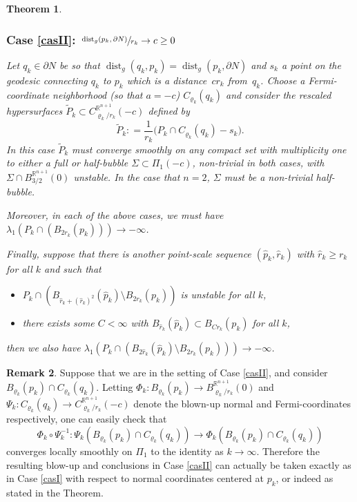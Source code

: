 \documentclass[JEP,XML,SOM,Unicode]{cedram}
\newcounter{cas}
\DeclareMathOperator{\dist}{dist}
\newtheorem{thm}{Theorem}
\theoremstyle{definition}
\newtheorem{rmk}[thm]{Remark}
\newcommand{\R}{\mathbb{R}}
\begin{document}
\begin{thm}
\subsubsection*{\label{casII}Case \ref{casII}: $\sfrac{\dist_g(p_k,\partial N)}{r_k}\to c\geq 0$}
Let $q_k\in\partial N$ be so that $\dist_g(q_k,p_k)=\dist_g(p_k,\partial N)$ and $s_k$ a point on the geodesic connecting $q_k$ to $p_k$ which is a distance~$cr_k$ from~$q_k$. Choose a Fermi-coordinate neighborhood (so that $a=-c$) $C_{\varrho_k}(q_k)$ and consider the rescaled hypersurfaces $\widetilde{P}_k \subset C^{\R^{n+1}}_{\varrho_k/r_k}(-c)$ defined by
\begin{equation*}
\widetilde{P}_k : = \frac{1}{r_k} \big(P_k\cap C_{\varrho_k}(q_k)- s_k\big).
\end{equation*} In this case $\widetilde{P}_k$ must converge smoothly on any compact set with multiplicity one to \emph{either a full or half-bubble} $\Sigma\subset \Pi_1(-c)$, non-trivial in both cases, with $\Sigma\cap B^{\R^{n+1}}_{3/2}(0)$ unstable.
In the case that $n=2$, $\Sigma$ must be a non-trivial half-bubble.

Moreover, in each of the above cases, we must have $\lambda_1(P_k \cap (B_{2r_k}(p_k)))\to -\infty$.

Finally, suppose that there is another point-scale sequence $(\widehat{p}_k, \widehat{r}_k)$ with $\widehat{r}_k \geq r_k$ for all $k$ and such that
\begin{itemize}
\item $P_k\cap (B_{\widehat{r}_k+ (\widehat{r}_k)^2}(\widehat{p}_k)\setminus B_{2r_k}(p_k))$ is unstable for all $k$,
\item there exists some $C<\infty$ with $B_{\widehat{r}_k}(\widehat{p}_k)\subset B_{Cr_k}(p_k)$ for all $k$,
\end{itemize}
then we also have $\lambda_1(P_k\cap (B_{2\widehat{r}_k}(\widehat{p}_k)\setminus B_{2r_k}(p_k))) \to -\infty$.
\addtocounter{cas}{-2}
\end{thm}

\begin{rmk}\label{rmk:coord}
Suppose that we are in the setting of Case \ref{casII}, and consider $B_{\varrho_k}(p_k)\cap C_{\varrho_k}(q_k)$. Letting $\Phi_k : B_{\varrho_k}(p_k) \to B^{\R^{n+1}}_{\varrho_k/r_k}(0)$ and $\Psi_k : C_{\varrho_k}(q_k)\to C^{\R^{n+1}}_{\varrho_k/r_k}(-c)$ denote the blown-up normal and Fermi-coordinates respectively, one can easily check that
$$\Phi_k\circ \Psi_k^{-1}: \Psi_k(B_{\varrho_k}(p_k)\cap C_{\varrho_k}(q_k)) \to \Phi_k(B_{\varrho_k}(p_k)\cap C_{\varrho_k}(q_k))$$
converges locally smoothly on $\Pi_1$ to the identity as $k\to \infty$. Therefore the resulting blow-up and conclusions in Case \ref{casII} can actually be taken exactly as in Case \ref{casI} with respect to normal coordinates centered at $p_k$, or indeed as stated in the Theorem.
\end{rmk}
\end{document}
